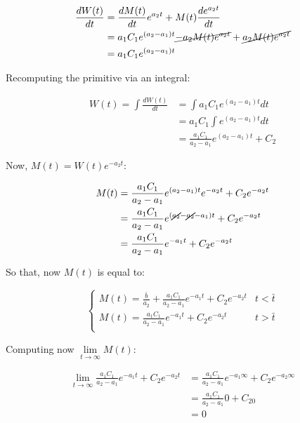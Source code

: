  \begin{align*}
    \frac{dW(t)}{dt} &= \frac{dM(t)}{dt}e^{a_2t} + M(t)\frac{de^{a_2t}}{dt}\\
                     &= a_1C_1e^{(a_2-a_1)t} \cancel{-a_2M(t)e^{a_2t}} + \cancel{a_2M(t)e^{a_2t}}\\
                     &= a_1C_1e^{(a_2-a_1)t}
  \end{align*}

  Recomputing the primitive via an integral:

  \begin{align*}
    W(t) = \int\frac{dW(t)}{dt} &= \int a_1C_1e^{(a_2-a_1)t}dt\\
                                &= a_1C_1\int e^{(a_2-a_1)t}dt\\
                                &=\frac{a_1C_1}{a_2-a_1}e^{(a_2-a_1)t} + C_2
  \end{align*}

  Now, $M(t) = W(t) e^{-a_2t}$:

  \begin{align*}
    M(t) &= \frac{a_1C_1}{a_2-a_1}e^{(a_2-a_1)t}e^{-a_2t} + C_2e^{-a_2t}\\
         &= \frac{a_1C_1}{a_2-a_1}e^{(\cancel{a_2}-\cancel{a_2}-a_1)t} + C_2e^{-a_2t}\\
         &= \frac{a_1C_1}{a_2-a_1}e^{-a_1t} + C_2e^{-a_2t}\\
  \end{align*}

  So that, now $M(t)$ is equal to:

  $$\begin{cases}
    M(t) = \frac{\bar{b}}{a_2} + \frac{a_1C_1}{a_2-a_1}e^{-a_1t} + C_2e^{-a_2t} & t<\bar{t}\\
    M(t) = \frac{a_1C_1}{a_2-a_1}e^{-a_1t} + C_2e^{-a_2t} & t>\bar{t}\\
  \end{cases}$$

  Computing now $\lim\limits_{t\to\infty}M(t)$:

  \begin{align*}
    \lim\limits_{t\to\infty} \frac{a_1C_1}{a_2-a_1}e^{-a_1t} + C_2e^{-a_2t}&= \frac{a_1C_1}{a_2-a_1}e^{-a_1\infty} + C_2e^{-a_2\infty}\\
                                                                           &=\frac{a_1C_1}{a_2-a_1}0 + C_20\\
                                                                           &= 0
  \end{align*}

